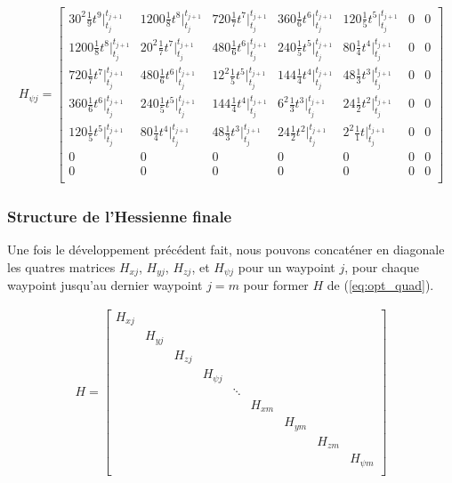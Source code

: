 \documentclass{article}
\begin{document}
\begin{align}\label{eq:hessienne_psi}
H_{\psi j} =
\begin{bmatrix}
    30^2 \frac{1}{9} t^9 \Big|_{t_j}^{t_{j+1}} 
    	& 1200 \frac{1}{8}t^8 \Big|_{t_j}^{t_{j+1}} 
    	& 720 \frac{1}{7}t^7 \Big|_{t_j}^{t_{j+1}} 
    	& 360 \frac{1}{6}t^6 \Big|_{t_j}^{t_{j+1}} 
    	& 120 \frac{1}{5}t^5 \Big|_{t_j}^{t_{j+1}} 
    	& 0 & 0 \\
    1200 \frac{1}{8}t^8 \Big|_{t_j}^{t_{j+1}} 
    	& 20^2 \frac{1}{7}t^7 \Big|_{t_j}^{t_{j+1}} 
    	& 480 \frac{1}{6}t^6 \Big|_{t_j}^{t_{j+1}} 
    	& 240 \frac{1}{5}t^5 \Big|_{t_j}^{t_{j+1}} 
    	& 80 \frac{1}{4}t^4 \Big|_{t_j}^{t_{j+1}} & 0 & 0 \\
    720 \frac{1}{7}t^7 \Big|_{t_j}^{t_{j+1}} 
    	& 480 \frac{1}{6}t^6 \Big|_{t_j}^{t_{j+1}}  
    	& 12^2 \frac{1}{5}t^5 \Big|_{t_j}^{t_{j+1}} 
    	& 144 \frac{1}{4}t^4 \Big|_{t_j}^{t_{j+1}} 
    	& 48 \frac{1}{3}t^3 \Big|_{t_j}^{t_{j+1}} & 0 & 0 \\
    360 \frac{1}{6}t^6 \Big|_{t_j}^{t_{j+1}} 
    	& 240 \frac{1}{5}t^5 \Big|_{t_j}^{t_{j+1}} 
    	& 144 \frac{1}{4}t^4 \Big|_{t_j}^{t_{j+1}}  
    	& 6^2 \frac{1}{3}t^3 \Big|_{t_j}^{t_{j+1}} 
    	& 24 \frac{1}{2}t^2 \Big|_{t_j}^{t_{j+1}} & 0 & 0 \\
    120 \frac{1}{5}t^5 \Big|_{t_j}^{t_{j+1}} 
    	& 80 \frac{1}{4}t^4 \Big|_{t_j}^{t_{j+1}} 
    	& 48 \frac{1}{3}t^3 \Big|_{t_j}^{t_{j+1}} 
    	& 24 \frac{1}{2}t^2 \Big|_{t_j}^{t_{j+1}}
    	&  2^2 \frac{1}{1}t\Big|_{t_j}^{t_{j+1}} & 0 & 0 \\
    0 & 0 & 0 & 0 & 0 & 0 & 0 \\
    0 & 0 & 0 & 0 & 0 & 0 & 0 \\
\end{bmatrix}
\end{align}


\subsubsection{Structure de l'Hessienne finale}

Une fois le développement précédent fait, nous pouvons concaténer en diagonale les quatres matrices $H_{xj}$, $H_{yj}$, $H_{zj}$, et $H_{\psi j}$ pour un waypoint $j$, pour chaque waypoint jusqu'au dernier waypoint $j=m$ pour former $H$ de (\ref{eq:opt_quad}).

\begin{align}
H=
\begin{bmatrix}
	H_{xj} \\
	&	H_{yj} \\
	&	&		H_{zj} \\
	&	&		&		H_{\psi j} \\
	&	&		&		&			\ddots \\
	&	&		&		&			&		H_{xm} \\
	&	&		&		&			&		&		H_{ym} \\
	&	&		&		&			&		&		&		H_{zm} \\
	&	&		&		&			&		&		&		&		H_{\psi m} \\
\end{bmatrix}
\end{align}
\end{document}
